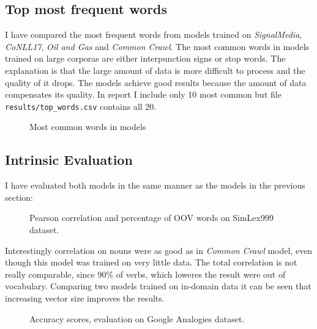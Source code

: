\documentclass{article}
\begin{document}
\subsection{Top most frequent words}
I have compared the most frequent words from models trained on \textit{SignalMedia},
\textit{CoNLL17}, \textit{Oil and Gas} and \textit{Common Crawl}. The most common words in models trained on large corporas are either interpunction signs
or stop words. The explanation is that the large amount of data is more difficult to process
and the quality of it drops. The models achieve good results because the amount of data
compensates its quality. In report I include only 10 most common but file \lstinline{results/top_words.csv}
contains all 20.


\begin{figure}
	\centering
	\scalebox{0.92}{}
	\caption{Most common words in models}
\end{figure}

\clearpage

\subsection{Intrinsic Evaluation}
I have evaluated both models in the same manner as the models in the previous section:
\begin{figure}[h]
	\centering
	\begin{minipage}{0.45\textwidth}
	
	\end{minipage}
	\begin{minipage}{0.45\textwidth}
	\centering
	
	\end{minipage}
	\caption{Pearson correlation and percentage of OOV words on SimLex999 dataset.}
\end{figure}

Interestingly correlation on nouns were as good as in \textit{Common Crawl} model, even
though this model was trained on very little data. The total correlation is not really comparable,
since 90\% of verbs, which loweres the result were out of vocabulary. Comparing two models trained
on in-domain data it can be seen that increasing vector size improves the results.

\begin{figure}[h]
	\centering
	
	\caption{Accuracy scores, evaluation on Google Analogies dataset.}
\end{figure}
\end{document}
